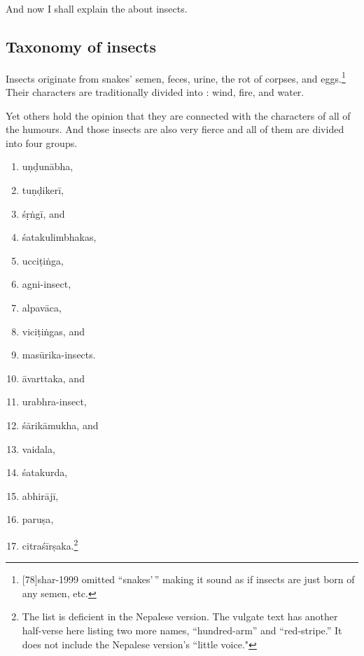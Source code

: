 \begin{translation}

\item[1]
 And now I shall explain the  about 
 insects.
 
 


\subsection{Taxonomy of insects}


\item [3] 

Insects originate from snakes' semen, feces, urine, the rot of corpses,
and eggs.\footnote{[78]{shar-1999} omitted “snakes'\,” making it 
sound as if insects are just born of any semen, etc.}  Their
characters are traditionally divided
into : wind, fire, and water.

\item[4]

Yet others hold the opinion that they are connected with the
characters of all of the humours. And those
insects are also very fierce and all of them are divided into four
groups.

\item[5--6]
\begin{multicols}{2}
\begin{enumerate}
    \item \Gls{uṇḍunābha},
    \item \Gls{tuṇḍikerī},
    \item \Gls{śṛṅgī}, and
    \item \Glspl{śatakulimbhaka},
    \item \Gls{ucciṭiṅga},
    \item \Gls{agni-insect},
    \item \Gls{alpavāca},
    \item \Glspl{viciṭiṅga},
    and
    \item \Glspl{masūrika-insect}.
    \item \Gls{āvarttaka}, and
    \item \Gls{urabhra-insect},
    \item \Gls{śārikāmukha}, and
    \item \Gls{vaidala},
    \item \Gls{śatakurda},
    \item \Gls{abhirājī},
    \item \Gls{paruṣa},
    \item \Gls{citraśīrṣaka}.\footnote{The list is deficient in the Nepalese version.  
    The
        vulgate text has another half-verse here listing two more names,
         “hundred-arm” and  “red-stripe.” It does
        not include the Nepalese version's  “little voice."}
\end{enumerate}
\end{multicols}


\end{translation}
